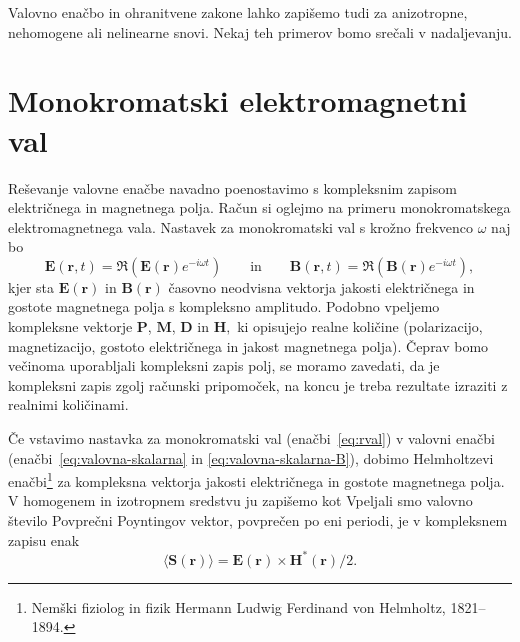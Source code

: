 Valovno enačbo in ohranitvene zakone lahko zapišemo tudi za anizotropne,
nehomogene ali nelinearne snovi. Nekaj teh primerov bomo srečali v nadaljevanju.

\section{Monokromatski elektromagnetni val}
Reševanje valovne enačbe navadno poenostavimo s kompleksnim
zapisom električnega in magnetnega polja. Račun si
oglejmo na primeru monokromatskega elektromagnetnega vala. Nastavek
za monokromatski val s krožno frekvenco $\omega$ naj bo
\begin{equation}
\mathbf{E}(\mathbf{r},t)  =\mathfrak{\Re}(\mathbf{E}(\mathbf{r})e^{-i\omega t})\qquad \textrm{in} \qquad
\mathbf{B}(\mathbf{r},t)  =\mathfrak{\Re}(\mathbf{B}(\mathbf{r})e^{-i\omega t}),
\label{eq:rval}
\end{equation}
kjer sta $\mathbf E(\mathbf{r})$ in $\mathbf B(\mathbf{r})$ časovno
neodvisna vektorja jakosti električnega in gostote
magnetnega polja s kompleksno
amplitudo. Podobno vpeljemo kompleksne vektorje $\mathbf{P}$,
$\mathbf{M}$, $\mathbf{D}$ in $\mathbf{H},$ ki opisujejo realne količine (polarizacijo,
magnetizacijo, gostoto električnega in jakost magnetnega polja).
Čeprav bomo večinoma uporabljali kompleksni zapis polj, se moramo zavedati, da
je kompleksni zapis zgolj računski pripomoček, na koncu
je treba rezultate izraziti z realnimi količinami. 

Če vstavimo nastavka za monokromatski val (enačbi~\ref{eq:rval}) v valovni enačbi
(enačbi~\ref{eq:valovna-skalarna} in \ref{eq:valovna-skalarna-B}), 
dobimo Helmholtzevi
enačbi\footnote{Nemški fiziolog in fizik Hermann Ludwig Ferdinand von Helmholtz, 1821--1894.} 
za kompleksna vektorja jakosti električnega in gostote magnetnega polja.
V homogenem in izotropnem sredstvu ju zapišemo kot
Vpeljali smo valovno število
Povprečni Poyntingov vektor, povprečen
po eni periodi, je v kompleksnem zapisu enak
\begin{equation}
\langle\mathbf{S}(\mathbf{r})\rangle=\mathbf{E}(\mathbf{r})\times\mathbf{H}^{*}(\mathbf{r})/2.
\label{eq:Poyntingov-vektor-c}
\end{equation}

